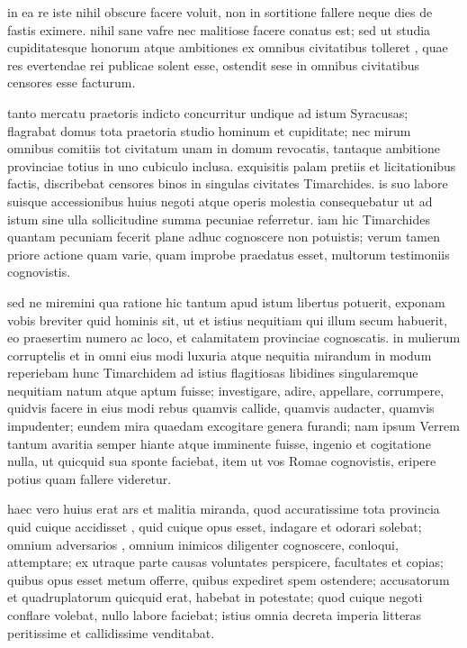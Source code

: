  in ea re iste nihil obscure facere voluit, non in sortitione fallere neque dies de fastis eximere. nihil sane vafre nec malitiose facere conatus est; sed ut studia cupiditatesque honorum atque ambitiones ex omnibus civitatibus tolleret , quae res evertendae rei publicae solent esse, ostendit sese in omnibus civitatibus censores esse facturum.

 tanto mercatu praetoris indicto concurritur undique ad istum Syracusas; flagrabat domus tota praetoria studio hominum et cupiditate; nec mirum omnibus comitiis tot civitatum unam in domum revocatis, tantaque ambitione provinciae totius in uno cubiculo inclusa. exquisitis palam pretiis et licitationibus factis, discribebat censores binos in singulas civitates Timarchides. is suo labore suisque accessionibus huius negoti atque operis molestia consequebatur ut ad istum sine ulla sollicitudine summa pecuniae referretur. iam hic Timarchides quantam pecuniam fecerit plane adhuc cognoscere non potuistis; verum tamen priore actione quam varie, quam improbe praedatus esset, multorum testimoniis cognovistis.

 sed ne miremini qua ratione hic tantum apud istum libertus potuerit, exponam vobis breviter quid hominis sit, ut et istius nequitiam qui illum secum habuerit, eo praesertim numero ac loco, et calamitatem provinciae cognoscatis. in mulierum corruptelis et in omni eius modi luxuria atque nequitia mirandum in modum reperiebam hunc Timarchidem ad istius flagitiosas libidines singularemque nequitiam natum atque aptum fuisse; investigare, adire, appellare, corrumpere, quidvis facere in eius modi rebus quamvis callide, quamvis audacter, quamvis impudenter; eundem mira quaedam excogitare genera furandi; nam ipsum Verrem tantum avaritia semper hiante atque imminente fuisse, ingenio et cogitatione nulla, ut quicquid sua sponte faciebat, item ut vos Romae cognovistis, eripere potius quam fallere videretur.

 haec vero huius erat ars et malitia miranda, quod accuratissime tota provincia quid cuique accidisset , quid cuique opus esset, indagare et odorari solebat; omnium adversarios , omnium inimicos diligenter cognoscere, conloqui, attemptare; ex utraque parte causas voluntates perspicere, facultates et copias; quibus opus esset metum offerre, quibus expediret spem ostendere; accusatorum et quadruplatorum quicquid erat, habebat in potestate; quod cuique negoti conflare volebat, nullo labore faciebat; istius omnia decreta imperia litteras peritissime et callidissime venditabat.

